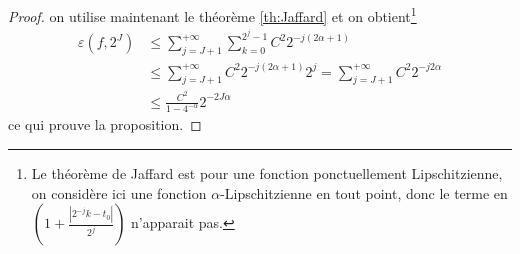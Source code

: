 \begin{proof}
	on utilise maintenant le théorème \ref{th:Jaffard} et on obtient\footnote{Le théorème de Jaffard est pour une fonction ponctuellement Lipschitzienne, on considère ici une fonction $\alpha$-Lipschitzienne en tout point, donc le terme en $(1 + \frac{|2^{-j}k -t_0|}{2^j})$ n'apparait pas.}
	\begin{align*}
		\varepsilon(f, 2^J) &\leq \sum_{j=J+1}^{+\infty} \sum_{k=0}^{2^j -1} C^2 2^{-j(2\alpha + 1)} \\
		&\leq \sum_{j=J+1}^{+\infty} C^2 2^{-j(2\alpha + 1)} 2^{j} = \sum_{j=J+1}^{+\infty} C^2 2^{-j2\alpha} \\
		&\leq \frac{C^2}{1 - 4^{-\alpha}} 2^{-2J\alpha}	
	\end{align*}
	ce qui prouve la proposition.
\end{proof}

